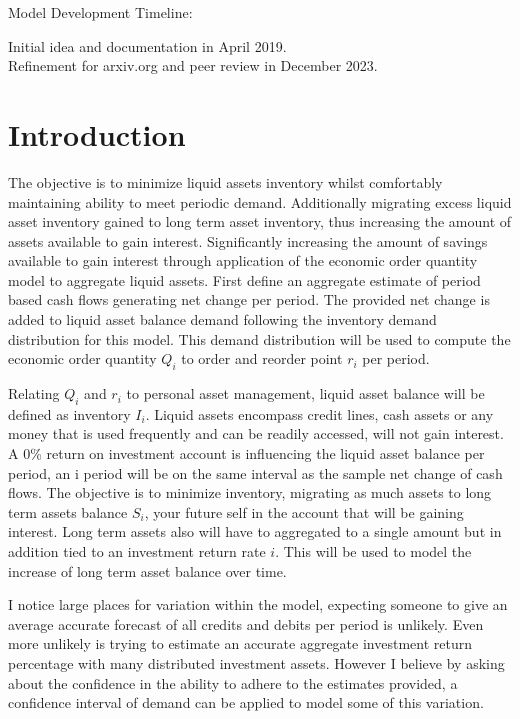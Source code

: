 \documentclass{article}
\begin{document}
Model Development Timeline:

Initial idea and documentation in April 2019.\\
Refinement for arxiv.org and peer review in December 2023. \\

\section{Introduction}

The objective is to minimize liquid assets inventory whilst comfortably maintaining ability to meet periodic demand. Additionally migrating excess liquid asset inventory gained to long term asset inventory, thus increasing the amount of assets available to gain interest. Significantly increasing  the amount of savings available to gain interest through application of the economic order quantity model to aggregate liquid assets. First define an aggregate estimate of period based cash flows generating net change per period. The provided net change is added to liquid asset balance demand following the inventory demand distribution for this model. This demand distribution will be used to compute the economic order quantity $Q_{i}$ to order and reorder point $r_{i}$ per period. 

Relating $Q_{i}$ and $r_{i}$ to personal asset management, liquid asset balance will be defined as inventory $I_{i}$. Liquid assets encompass credit lines, cash assets or any money that is used frequently and can be readily accessed, will not gain interest.  A 0\% return on investment account is influencing the liquid asset balance per period, an i period will be on the same interval as the sample net change of cash flows. The objective is to minimize inventory, migrating as much assets to long term assets balance $S_{i}$, your future self in the account that will be gaining interest. Long term assets also will have to aggregated to a single amount but in addition tied to an investment return rate $i$. This will be used to model the increase of  long term asset balance over time.

I notice large places for variation within the model, expecting someone to give an average accurate forecast of all credits and debits per period is unlikely. Even more unlikely is trying to estimate an accurate aggregate investment return percentage with many distributed investment assets. However I believe by asking about the confidence in the ability to adhere to the estimates provided, a confidence interval of demand can be applied to model some of this variation.  
\end{document}
